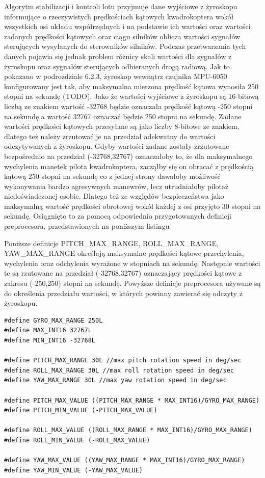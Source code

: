 Algorytm stabilizacji i kontroli lotu przyjmuje dane wyjściowe z żyroskopu informujące o rzeczywistych prędkościach kątowych kwadrokoptera wokół wszystkich osi układu współrzędnych i na podstawie ich wartości oraz wartości zadanych prędkości kątowych oraz ciągu silników oblicza wartości sygnałów sterujących wysyłanych do sterowników silników. Podczas przetwarzania tych danych pojawia się jednak problem różnicy skali wartości dla sygnałów z żyroskopu oraz sygnałów sterujących odbieranych drogą radiową. Jak to pokazano w  podrozdziale 6.2.3, żyroskop wewnątrz czujnika MPU-6050 konfigurowany jest tak, aby maksymalna mierzona prędkość kątowa wynosiła 250 stopni na sekundę (TODO). Jako że wartości wyjściowe z żyroskopu są 16-bitową liczbą ze znakiem wartość -32768 będzie oznaczała prędkość kątową -250 stopni na sekundę a wartość 32767 oznaczać będzie 250 stopni na sekundę. Zadane wartości prędkości kątowych przesyłane są jako liczby 8-bitowe ze znakiem, dlatego też należy zrzutować je na przedział adekwatny do wartości odczytywanych z żyroskopu. Gdyby wartości zadane zostały zrzutowane bezpośrednio na przedział (-32768,32767) oznaczałoby to, że dla maksymalnego wychylenia manetek pilota kwadrokoptera, zacząłby się on obracać z prędkością kątową 250 stopni na sekundę co z jednej strony dawałoby możliwość wykonywania bardzo agresywnych manewrów, lecz utrudniałoby pilotaż niedoświadczonej osobie. Dlatego też ze względów bezpieczeństwa jako maksymalną wartość prędkości obrotowej wokół każdej z osi przyjęto 30 stopni na sekundę. Osiągnięto to za pomocą odpowiednio przygotowanych definicji preprocesora, przedstawionych na poniższym listingu


Poniższe definicje PITCH\_MAX\_RANGE, ROLL\_MAX\_RANGE, YAW\_MAX\_RANGE określają maksymalne prędkości kątowe przechylenia, wychylenia oraz odchylenia wyrażone w stopniach na sekundę. Następnie wartości te są rzutowane na przedział (-32768,32767) oznaczający prędkości kątowe z zakresu (-250,250) stopni na sekundę. Powyższe definicje preprocesora używane są do określenia przedziału wartości, w których powinny zawierać się odczyty z żyroskopu.

\begin{lstlisting}
#define GYRO_MAX_RANGE 250L
#define MAX_INT16 32767L
#define MIN_INT16 -32768L

#define PITCH_MAX_RANGE 30L //max pitch rotation speed in deg/sec
#define ROLL_MAX_RANGE 30L //max roll rotation speed in deg/sec
#define YAW_MAX_RANGE 30L //max yaw rotation speed in deg/sec

#define PITCH_MAX_VALUE ((PITCH_MAX_RANGE * MAX_INT16)/GYRO_MAX_RANGE)
#define PITCH_MIN_VALUE (-PITCH_MAX_VALUE)

#define ROLL_MAX_VALUE ((ROLL_MAX_RANGE * MAX_INT16)/GYRO_MAX_RANGE)
#define ROLL_MIN_VALUE (-ROLL_MAX_VALUE)

#define YAW_MAX_VALUE ((YAW_MAX_RANGE * MAX_INT16)/GYRO_MAX_RANGE)
#define YAW_MIN_VALUE (-YAW_MAX_VALUE)
\end{lstlisting}


